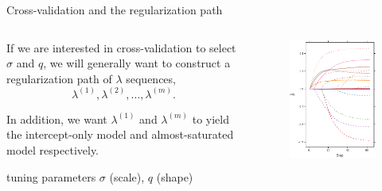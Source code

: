 \documentclass[10pt]{beamer}
\begin{document}
\begin{frame}{Cross-validation and the regularization path}
    \begin{columns}[c]
        \begin{column}{0.45\linewidth}
        If we are interested in cross-validation to select \(\sigma\) and \(q\), we will generally want to construct a \alert{regularization path} of \(\lambda\) sequences, \[\lambda^{(1)}, \lambda^{(2)}, \dots, \lambda^{(m)}.\]
        
        In addition, we want \(\lambda^{(1)}\) and \(\lambda^{(m)}\) to yield the \alert{intercept-only} model and \alert{almost-saturated} model respectively.\medskip
        
        \begin{block}{tuning parameters}
        \(\sigma\) (scale), \(q\) (shape)
        \end{block}
        \end{column}
        \begin{column}{0.45\linewidth}
            \begin{figure}
                \centering
                \includegraphics[width=\linewidth]{figures/slope-path.pdf}
            \end{figure}
        \end{column}
    \end{columns}
\end{frame}
\end{document}
